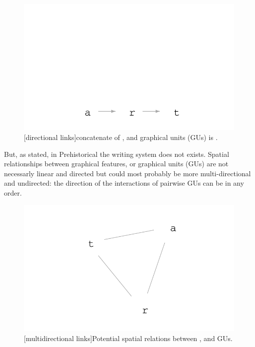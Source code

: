 \documentclass[article]{jss}
\begin{document}
\begin{figure}[H]
\includegraphics{article_rvTH13-002}
[directional links]{concatenate of ,  and  graphical units (GUs) is .}
\end{figure}
But, as stated, in Prehistorical the writing system does not exists. Spatial relationships between graphical features, or graphical units (GUs) are not necessarly linear and directed but could most probably be more multi-directional and undirected: the direction of the interactions of pairwise GUs can be in any order.  

\begin{figure}[H]
\includegraphics{article_rvTH13-003}
[multidirectional links]{Potential spatial relations between ,  and  GUs.}
\end{figure}
\end{document}
